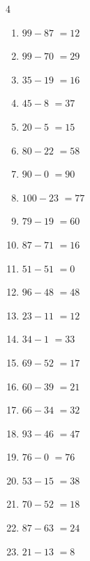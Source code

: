 \begin{multicols}{4}
\begin{enumerate}
  \item $99-87$
        $=12$

  \item $99-70$
        $=29$

  \item $35-19$
        $=16$

  \item $45-8$
        $=37$

  \item $20-5$
        $=15$

  \item $80-22$
        $=58$

  \item $90-0$
        $=90$

  \item $100-23$
        $=77$

  \item $79-19$
        $=60$

  \item $87-71$
        $=16$

  \item $51-51$
        $=0$

  \item $96-48$
        $=48$

\columnbreak %

  \item $23-11$
        $=12$

  \item $34-1$
        $=33$

  \item $69-52$
        $=17$

  \item $60-39$
        $=21$

  \item $66-34$
        $=32$

  \item $93-46$
        $=47$

  \item $76-0$
        $=76$

  \item $53-15$
        $=38$

  \item $70-52$
        $=18$

  \item $87-63$
        $=24$

  \item $21-13$
        $=8$


\end{enumerate}
\end{multicols}
